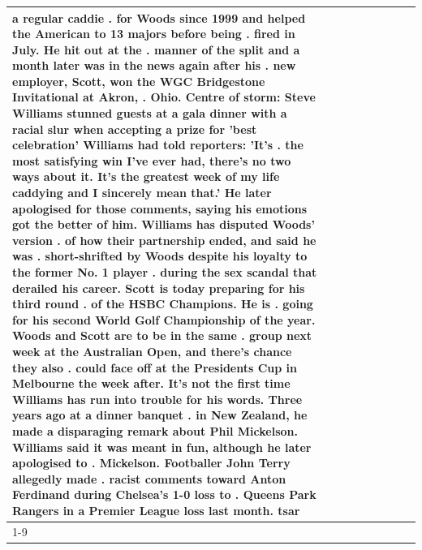 \begin{table}[H]
\begin{tabular}{lllrlllll}
a regular caddie . for Woods since 1999 and helped the American to 13 majors before being . fired in July. He hit out at the . manner of the split and a month later was in the news again after his . new employer, Scott, won the WGC Bridgestone Invitational at Akron, . Ohio. Centre of storm: Steve Williams stunned guests at a gala dinner with a racial slur when accepting a prize for 'best celebration' Williams had told reporters: 'It's . the most satisfying win I've ever had, there's no two ways about it. It's the greatest week of my life caddying and I sincerely mean that.' He later apologised for those comments, saying his emotions got the better of him. Williams has disputed Woods' version . of how their partnership ended, and said he was . short-shrifted by Woods despite his loyalty to the former No. 1 player . during the sex scandal that derailed his career. Scott is today preparing for his third round . of the HSBC Champions. He is . going for his second World Golf Championship of the year. Woods and Scott are to be in the same . group next week at the Australian Open, and there's chance they also . could face off at the Presidents Cup in Melbourne the week after. It's not the first time Williams has run into trouble for his words. Three years ago at a dinner banquet . in New Zealand, he made a disparaging remark about Phil Mickelson. Williams said it was meant in fun, although he later apologised to . Mickelson. Footballer John Terry allegedly made . racist comments toward Anton Ferdinand during Chelsea's 1-0 loss to . Queens Park Rangers in a Premier League loss last month. tsar \\
\cline{1-9}

\end{tabular}
\end{table}
